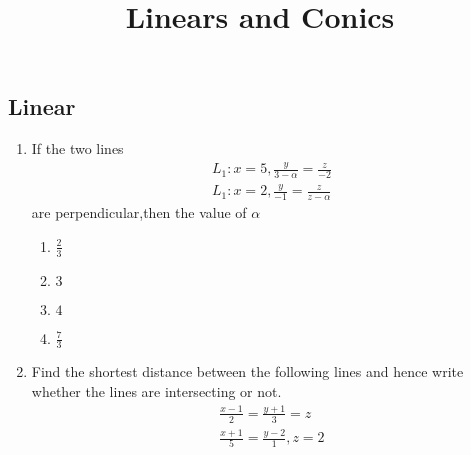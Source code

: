 \documentclass{article}
\begin{document}
\begin{center}
\title{ Linears and Conics}
\date{}
\maketitle
\section{Linear}     
\end{center}
\begin{enumerate}
    \item If the two lines
    \begin{align}
          L_1 : x=5,\frac{y}{3-\alpha}=\frac{z}{-2}\\
         L_1 : x=2,\frac{y}{-1}=\frac{z}{z-\alpha} 
       \end{align}
  are perpendicular,then the value of $\alpha$ \\
        \begin{enumerate}
        \item $\frac{2}{3}$
        \item $3$
        \item $4$
        \item $\frac{7}{3}$
    \end{enumerate}

    \item Find the shortest distance between the following lines and hence write
whether the lines are intersecting or not.\\
\begin{align}
    \frac{x-1}{2} = \frac{y+1}{3} = z \\
    \frac{x+1}{5}=\frac{y-2}{1},z=2
\end{align}


\end{enumerate}
\end{document}

